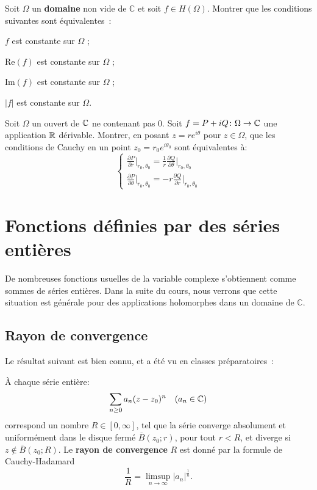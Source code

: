 \begin{exercice}
Soit $\Omega$ un \textbf{domaine} non vide de $\mathbb{C}$ et soit $f \in H(\Omega)$. Montrer que les conditions suivantes sont équivalentes~:
\begin{MYenumerate}
\item $f$ est constante sur $\Omega$ ;
\item $\text{Re}(f)$ est constante sur $\Omega$ ;
\item $\text{Im}(f)$ est constante sur $\Omega$ ;
\item $\lvert f \rvert$ est constante sur $\Omega$.
\end{MYenumerate}
\end{exercice}
\begin{exercice}
Soit $\Omega$ un ouvert de $\mathbb{C}$ ne contenant pas $0.$ Soit $f=P + i Q \colon \Omega \to \mathbb{C}$ une application $\mathbb R$ dérivable. Montrer, en posant $z=re^{i\theta}$ pour $z \in \Omega$, que les conditions de Cauchy en un point $z_0 = r_0 e^{i \theta_0}$ sont équivalentes à:
\[
\begin{cases}
    \frac{\partial P}{\partial r}\vert_{r_0,\theta_0} = \frac{1}{r}\frac{\partial Q}{\partial \theta}\vert_{r_0,\theta_0} \\
    \frac{\partial P}{\partial \theta}\vert_{r_0,\theta_0} =- r\frac{\partial Q}{\partial r}\vert_{r_0,\theta_0}
\end{cases}
\]
\end{exercice}


\section{Fonctions définies par des séries entières}
De nombreuses fonctions usuelles de la variable complexe s'obtiennent comme 
sommes de séries entières. Dans la suite du cours, nous verrons que cette
situation est générale pour des applications holomorphes dans un domaine de
$\mathbb{C}$. 

\subsection{Rayon de convergence}
Le résultat suivant est bien connu, et a été vu en classes préparatoires~: 

\begin{fprop}\label{prop:ray_cvg}
\`{A} chaque série entière:
\[\sum_{n \geq 0} a_n (z-z_0)^n \quad (a_n \in \mathbb{C})\]
correspond un nombre $R \in [0, \infty]$, tel que la série converge absolument et uniformément dans le disque fermé $\overline{B}(z_0 ; r)$, pour tout $r<R$, et diverge si $z \notin \overline{B}(z_0 ; R)$. Le \textbf{rayon de convergence} $R$ est donné par la formule de Cauchy-Hadamard 
\[\frac{1}{R}=\limsup_{n \to \infty} \lvert a_n\rvert^{\frac{1}{n}}.\]
\end{fprop}



